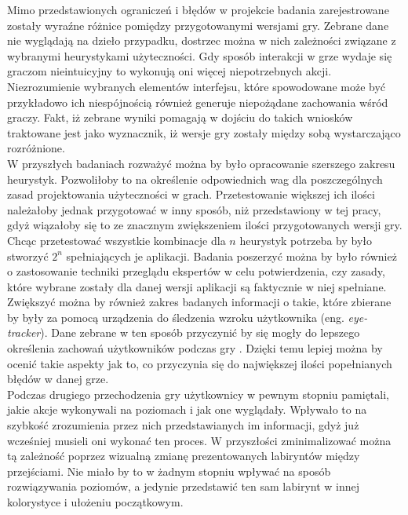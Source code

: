 \documentclass[a4paper,12pt,numbers=noenddot]{report}
\begin{document}
Mimo przedstawionych ograniczeń i błędów w projekcie badania zarejestrowane zostały wyraźne różnice pomiędzy przygotowanymi wersjami gry. Zebrane dane nie wyglądają na dzieło przypadku, dostrzec można w nich zależności związane z wybranymi heurystykami użyteczności. Gdy sposób interakcji w grze wydaje się graczom nieintuicyjny to wykonują oni więcej niepotrzebnych akcji. Niezrozumienie wybranych elementów interfejsu, które spowodowane może być przykładowo ich niespójnością również generuje niepożądane zachowania wśród graczy. Fakt, iż zebrane wyniki pomagają w dojściu do takich wniosków traktowane jest jako wyznacznik, iż wersje gry zostały między sobą wystarczająco rozróżnione. \\


W przyszłych badaniach rozważyć można by było opracowanie szerszego zakresu heurystyk. Pozwoliłoby to na określenie odpowiednich wag dla poszczególnych zasad projektowania użyteczności w grach. Przetestowanie większej ich ilości należałoby jednak przygotować w inny sposób, niż przedstawiony w tej pracy, gdyż wiązałoby się to ze znacznym zwiększeniem ilości przygotowanych wersji gry. Chcąc przetestować wszystkie kombinacje dla $n$ heurystyk potrzeba by było stworzyć $2^{n}$ spełniających je aplikacji. Badania poszerzyć można by było również o zastosowanie techniki przeglądu ekspertów w celu potwierdzenia, czy zasady, które wybrane zostały dla danej wersji aplikacji są faktycznie w niej spełniane.\\
Zwiększyć można by również zakres badanych informacji o takie, które zbierane by były za pomocą urządzenia do śledzenia wzroku użytkownika (eng. \textit{eye-tracker}). Dane zebrane w ten sposób przyczynić by się mogły do lepszego określenia zachowań użytkowników podczas gry \cite{online_Eyetracking}. Dzięki temu lepiej można by ocenić takie aspekty jak to, co przyczynia się do największej ilości popełnianych błędów w danej grze.\\
Podczas drugiego przechodzenia gry użytkownicy w pewnym stopniu pamiętali, jakie akcje wykonywali na poziomach i jak one wyglądały. Wpływało to na szybkość zrozumienia przez nich przedstawianych im informacji, gdyż już wcześniej musieli oni wykonać ten proces. W przyszłości zminimalizować można tą zależność poprzez wizualną zmianę prezentowanych labiryntów między przejściami. Nie miało by to w żadnym stopniu wpływać na sposób rozwiązywania poziomów, a jedynie przedstawić ten sam labirynt w innej kolorystyce i ułożeniu początkowym.\\
\end{document}
